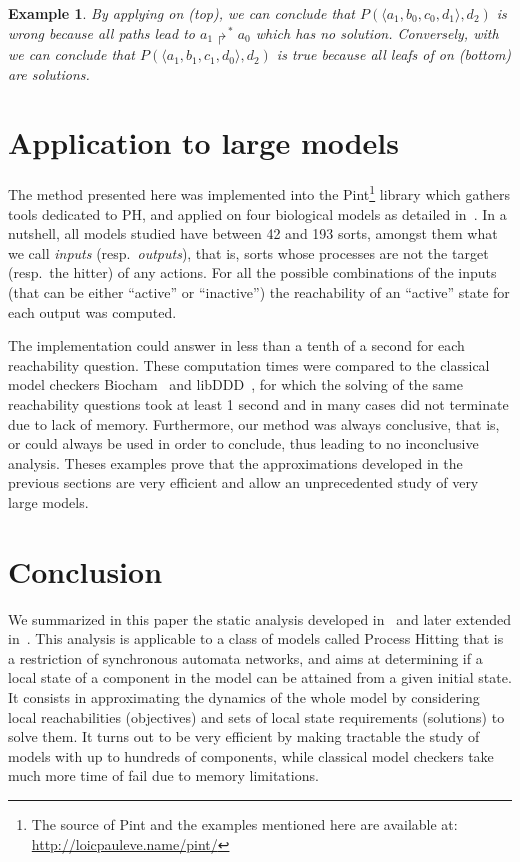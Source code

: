 \documentclass{movep}
\def\pref{\prettyref}
\newtheorem*{example*}{Example}{\itshape}{}
\newcommand{\PHfrappeB}{\Rsh}
\newcommand{\PHobjectif}[2]{\mbox{$#1\PHfrappeB^*\!#2$}}
\newcommand{\PHobj}{\PHobjectif}
\newcommand{\PHetat}[1]{\mbox{$\langle #1 \rangle$}}
\newcounter{la}
\newcommand{\resp}{resp.\ }
\begin{document}
\begin{example*}
  By applying \pref{th:oa} on \pref{fig:glc}(top),
  we can conclude that $P(\PHetat{a_1,b_0,c_0,d_1}, d_2)$ is wrong
  because all paths lead to $\PHobj{a_1}{a_0}$ which has no solution.
  Conversely, with \pref{th:ua} we can conclude that
  $P(\PHetat{a_1,b_1,c_1,d_0}, d_2)$ is true
  because all leafs of on \pref{fig:glc}(bottom) are solutions.
\end{example*}




\section{Application to large models}
\label{sec:examples}

The method presented here was implemented into the
Pint\footnote{The source of Pint and the examples mentioned here are available at:
\url{http://loicpauleve.name/pint/}}
library which gathers tools dedicated to PH, and
applied on four biological models as detailed in~\cite{PMR12-MSCS}.
In a nutshell, all models studied have between 42 and 193 sorts,
amongst them what we call \emph{inputs} (\resp \emph{outputs}),
that is, sorts whose processes are not the target (\resp the hitter) of any actions.
For all the possible combinations of the inputs
(that can be either “active” or “inactive”)
the reachability of an “active” state for each output was computed.

The implementation could answer in less than a tenth of a second for each
reachability question.
These computation times were compared to the classical model checkers Biocham~\cite{fages2008formal}
and libDDD~\cite{couvreur2002data}, for which the solving of the same reachability questions
took at least 1 second and in many cases did not terminate due to lack of memory.
Furthermore, our method was always conclusive,
that is, \pref{th:oa} or \pref{th:ua} could always be used in order to conclude,
thus leading to no inconclusive analysis.
Theses examples prove that the approximations developed in the previous sections are very efficient
and allow an unprecedented study of very large models.



\section{Conclusion}
\label{sec:conclusion}

We summarized in this paper the static analysis developed in~\cite{PMR12-MSCS}
and later extended in~\cite{FPMR13-CS2Bio}.
This analysis is applicable to a class of models called Process Hitting that is a
restriction of synchronous automata networks,
and aims at determining if a local state of a component in the model can be attained from a given
initial state.
It consists in approximating the dynamics of the whole model by considering local
reachabilities (objectives)
and sets of local state requirements (solutions) to solve them.
It turns out to be very efficient by making tractable the study of models
with up to hundreds of components,
while classical model checkers take much more time of fail due to memory limitations.
\end{document}
